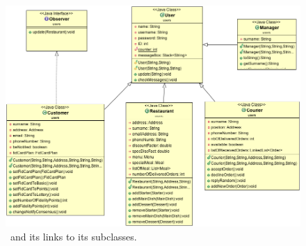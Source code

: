 \begin{figure}
  \begin{center}
    \includegraphics[scale=0.5]{./img/Users.png}
    \end{center}
  \caption{\umld \User~and its links to its subclasses.}
  \label{fig:users_uml}
\end{figure}

